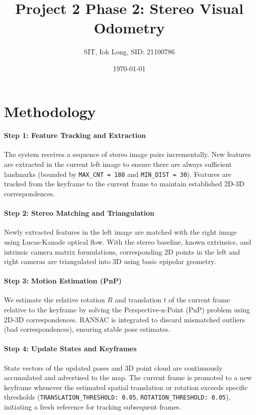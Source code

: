 \documentclass[11pt]{article}
\title{Project 2 Phase 2: Stereo Visual Odometry}
\author{SIT, Iok Long, SID: 21100786}
\date{\today}
\begin{document}
\maketitle

\section{Methodology}

\paragraph{Step 1: Feature Tracking and Extraction}
The system receives a sequence of stereo image pairs incrementally. New features are extracted in the current left image to ensure there are always sufficient landmarks (bounded by \texttt{MAX\_CNT = 180} and \texttt{MIN\_DIST = 30}). Features are tracked from the keyframe to the current frame to maintain established 2D-3D correspondences.

\paragraph{Step 2: Stereo Matching and Triangulation}
Newly extracted features in the left image are matched with the right image using Lucas-Kanade optical flow. With the stereo baseline, known extrinsics, and intrinsic camera matrix formulations, corresponding 2D points in the left and right cameras are triangulated into 3D using basic epipolar geometry.

\paragraph{Step 3: Motion Estimation (PnP)}
We estimate the relative rotation \(R\) and translation \(t\) of the current frame relative to the keyframe by solving the Perspective-n-Point (PnP) problem using 2D-3D correspondences. RANSAC is integrated to discard mismatched outliers (bad correspondences), ensuring stable pose estimates.

\paragraph{Step 4: Update States and Keyframes}
State vectors of the updated poses and 3D point cloud are continuously accumulated and advertised to the map. The current frame is promoted to a new keyframe whenever the estimated spatial translation or rotation exceeds specific thresholds (\texttt{TRANSLATION\_THRESHOLD: 0.05}, \texttt{ROTATION\_THRESHOLD: 0.05}), initiating a fresh reference for tracking subsequent frames. 
\end{document}
